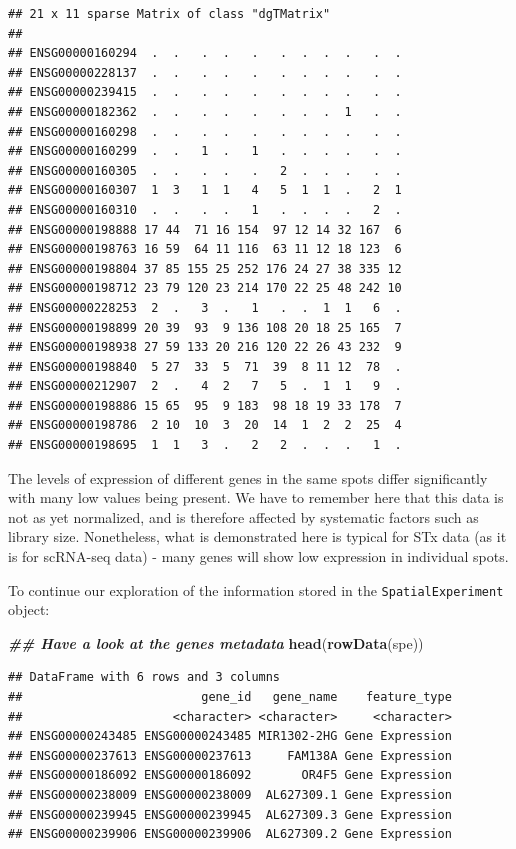\documentclass[
]{book}
\newenvironment{Shaded}{\begin{snugshade}}{\end{snugshade}}
\newcommand{\DocumentationTok}[1]{\textcolor[rgb]{0.56,0.35,0.01}{\textbf{\textit{#1}}}}
\newcommand{\FunctionTok}[1]{\textcolor[rgb]{0.13,0.29,0.53}{\textbf{#1}}}
\newcommand{\NormalTok}[1]{#1}
\begin{document}
\begin{verbatim}
## 21 x 11 sparse Matrix of class "dgTMatrix"
##                                                     
## ENSG00000160294  .  .   .  .   .   .  .  .  .   .  .
## ENSG00000228137  .  .   .  .   .   .  .  .  .   .  .
## ENSG00000239415  .  .   .  .   .   .  .  .  .   .  .
## ENSG00000182362  .  .   .  .   .   .  .  .  1   .  .
## ENSG00000160298  .  .   .  .   .   .  .  .  .   .  .
## ENSG00000160299  .  .   1  .   1   .  .  .  .   .  .
## ENSG00000160305  .  .   .  .   .   2  .  .  .   .  .
## ENSG00000160307  1  3   1  1   4   5  1  1  .   2  1
## ENSG00000160310  .  .   .  .   1   .  .  .  .   2  .
## ENSG00000198888 17 44  71 16 154  97 12 14 32 167  6
## ENSG00000198763 16 59  64 11 116  63 11 12 18 123  6
## ENSG00000198804 37 85 155 25 252 176 24 27 38 335 12
## ENSG00000198712 23 79 120 23 214 170 22 25 48 242 10
## ENSG00000228253  2  .   3  .   1   .  .  1  1   6  .
## ENSG00000198899 20 39  93  9 136 108 20 18 25 165  7
## ENSG00000198938 27 59 133 20 216 120 22 26 43 232  9
## ENSG00000198840  5 27  33  5  71  39  8 11 12  78  .
## ENSG00000212907  2  .   4  2   7   5  .  1  1   9  .
## ENSG00000198886 15 65  95  9 183  98 18 19 33 178  7
## ENSG00000198786  2 10  10  3  20  14  1  2  2  25  4
## ENSG00000198695  1  1   3  .   2   2  .  .  .   1  .
\end{verbatim}

The levels of expression of different genes in the same spots differ significantly with many low values being present. We have to remember here that this data is not as yet normalized, and is therefore affected by systematic factors such as library size. Nonetheless, what is demonstrated here is typical for STx data (as it is for scRNA-seq data) - many genes will show low expression in individual spots.

To continue our exploration of the information stored in the \texttt{SpatialExperiment} object:

\begin{Shaded}
\begin{Highlighting}[]
\DocumentationTok{\#\# Have a look at the genes metadata}
\FunctionTok{head}\NormalTok{(}\FunctionTok{rowData}\NormalTok{(spe))}
\end{Highlighting}
\end{Shaded}

\begin{verbatim}
## DataFrame with 6 rows and 3 columns
##                         gene_id   gene_name    feature_type
##                     <character> <character>     <character>
## ENSG00000243485 ENSG00000243485 MIR1302-2HG Gene Expression
## ENSG00000237613 ENSG00000237613     FAM138A Gene Expression
## ENSG00000186092 ENSG00000186092       OR4F5 Gene Expression
## ENSG00000238009 ENSG00000238009  AL627309.1 Gene Expression
## ENSG00000239945 ENSG00000239945  AL627309.3 Gene Expression
## ENSG00000239906 ENSG00000239906  AL627309.2 Gene Expression
\end{verbatim}
\end{document}
